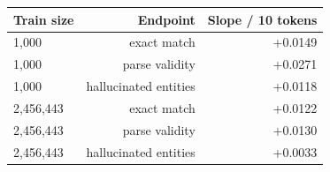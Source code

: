 \begin{tabular}{lrr}
\toprule
Train size & Endpoint & Slope / 10 tokens \\
\midrule
1{,}000 & exact match & +0.0149 \\
1{,}000 & parse validity & +0.0271 \\
1{,}000 & hallucinated entities & +0.0118 \\
2{,}456{,}443 & exact match & +0.0122 \\
2{,}456{,}443 & parse validity & +0.0130 \\
2{,}456{,}443 & hallucinated entities & +0.0033 \\
\bottomrule
\end{tabular}
